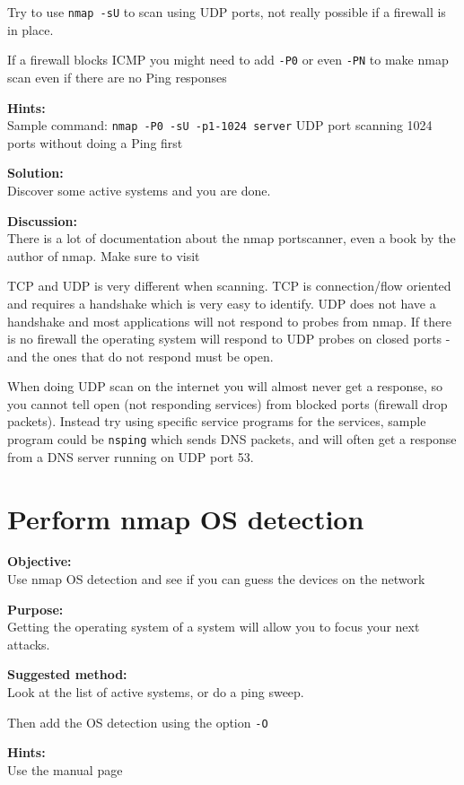 \documentclass[a4paper,11pt,notitlepage]{report}
\begin{document}
Try to use \verb+nmap -sU+ to scan using UDP ports, not really possible if a firewall is in place.

If a firewall blocks ICMP you might need to add \verb+-P0+
or even \verb+-PN+ to make nmap scan even if there are no Ping responses

{\bf Hints:} \\
Sample command: \verb+nmap -P0 -sU -p1-1024 server+ UDP port scanning
1024 ports without doing a Ping first

{\bf Solution:}\\
Discover some active systems and you are done.

{\bf Discussion:}\\
There is a lot of documentation about the nmap portscanner, even a book by the author
of nmap. Make sure to visit 

TCP and UDP is very different when scanning. TCP is connection/flow oriented and requires a handshake which is very easy to identify. UDP does not have a handshake and most applications will not respond to probes from nmap. If there is no firewall the operating system will respond to UDP probes on closed ports - and the ones that do not respond must be open.

When doing UDP scan on the internet you will almost never get a response, so you cannot tell open (not responding services) from blocked ports (firewall drop packets). Instead try using specific service programs for the services, sample program could be \verb+nsping+ which sends DNS packets, and will often get a response from a DNS server running on UDP port 53.

\chapter{Perform nmap OS detection}
\label{ex:nmap-os}

{\bf Objective:} \\
Use nmap OS detection and see if you can guess the devices on the network

{\bf Purpose:}\\
Getting the operating system of a system will allow you to focus your next attacks.

{\bf Suggested method:}\\
Look at the list of active systems, or do a ping sweep.

Then add the OS detection using the option \verb+-O+

{\bf Hints:} \\
Use the manual page
\end{document}

